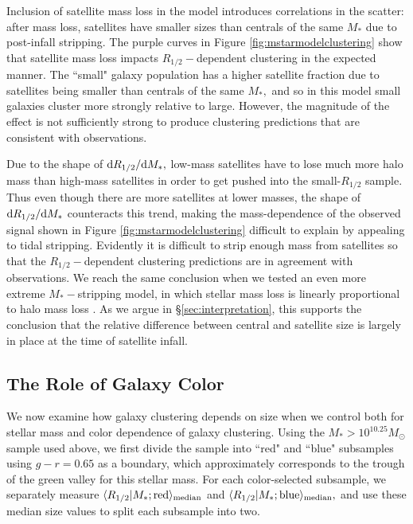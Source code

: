 \documentclass[usenatbib,usegraphicx,letterpaper]{mn2e}
\newcommand{\rhalf}{R_{1/2}}
\newcommand{\mstar}{M_{\ast}}
\newcommand{\median}[2]{\langle{#1}\vert{#2}\rangle_{\rm median}}
\newcommand{\msun}{M_\odot}
\begin{document}
Inclusion of satellite mass loss in the model introduces correlations in the scatter: after mass loss, satellites have smaller sizes than centrals of the same $\mstar$ due to post-infall stripping.
The purple curves in Figure \ref{fig:mstarmodelclustering} show that satellite mass loss impacts $\rhalf-$dependent clustering in the expected manner. The ``small" galaxy population has a higher satellite fraction due to satellites being smaller than centrals of the same $\mstar,$ and so in this model small galaxies cluster more strongly relative to large. However, the magnitude of the effect is not sufficiently strong  to produce clustering predictions that are consistent with observations. 

Due to the shape of ${\rm d}\rhalf/{\rm d}\mstar,$ low-mass satellites have to lose much more halo mass than high-mass satellites in order to get pushed into the small-$\rhalf$ sample. Thus even though there are more satellites at lower masses, the shape of ${\rm d}\rhalf/{\rm d}\mstar$ counteracts this trend, making the mass-dependence of the observed signal shown in Figure \ref{fig:mstarmodelclustering} difficult to explain by appealing to tidal stripping. Evidently it is difficult to strip enough mass from satellites so that the $\rhalf-$dependent clustering predictions are in agreement with observations.  We reach the same conclusion when we tested an even more extreme $\mstar-$stripping model, in which stellar mass loss is linearly proportional to halo mass loss \citep[][Model 1]{watson_etal12}.
As we argue in \S\ref{sec:interpretation}, this supports the conclusion that the relative difference between central and satellite size is largely in place at the time of satellite infall.

\subsection{The Role of Galaxy Color}
\label{subsec:colormorph}

We now examine how galaxy clustering depends on size when we control both for stellar mass and color dependence of galaxy clustering. Using the $\mstar>10^{10.25}\msun$ sample used above, we first divide the sample into ``red" and ``blue" subsamples using $g-r=0.65$ as a boundary, which approximately corresponds to the trough of the green valley for this stellar mass. For each color-selected subsample, we separately measure $\median{\rhalf}{\mstar; {\rm red}}$ and $\median{\rhalf}{\mstar; {\rm blue}},$ and use these median size values to split each subsample into two.
\end{document}
